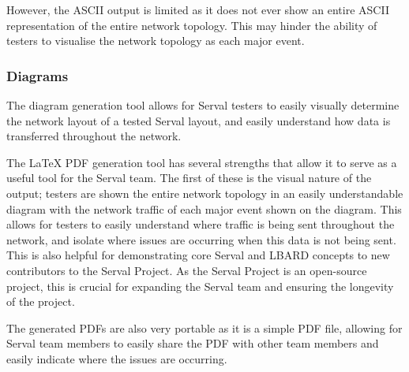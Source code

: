 However, the ASCII output is limited as it does not ever show an entire ASCII representation of the entire network topology.
This may hinder the ability of testers to visualise the network topology as each major event.

\subsubsection{Diagrams}
The diagram generation tool allows for Serval testers to easily visually determine the network layout of a tested Serval layout, and easily understand how data is transferred throughout the network.

The LaTeX PDF generation tool has several strengths that allow it to serve as a useful tool for the Serval team.
The first of these is the visual nature of the output; testers are shown the entire network topology in an easily understandable diagram with the network traffic of each major event shown on the diagram.
This allows for testers to easily understand where traffic is being sent throughout the network, and isolate where issues are occurring when this data is not being sent.
This is also helpful for demonstrating core Serval and LBARD concepts to new contributors to the Serval Project.
As the Serval Project is an open-source project, this is crucial for expanding the Serval team and ensuring the longevity of the project.

The generated PDFs are also very portable as it is a simple PDF file, allowing for Serval team members to easily share the PDF with other team members and easily indicate where the issues are occurring.


